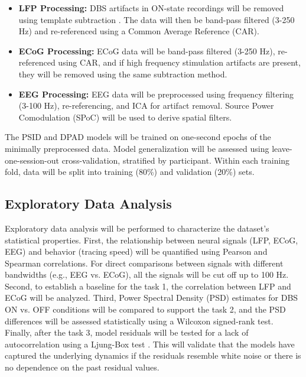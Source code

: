 \documentclass[12pt, a4paper]{article}
\begin{document}
\begin{itemize}

    \item \textbf{LFP Processing:} DBS artifacts in ON-state recordings will be removed using template subtraction \parencite{qianMethodRemovalDeep2017,hammerArtifactCharacterizationMultipurpose2022}. The data will then be band-pass filtered (3-250 Hz) and re-referenced using a Common Average Reference (CAR).

    \item \textbf{ECoG Processing:} ECoG data will be band-pass filtered (3-250 Hz), re-referenced using CAR, and if high frequency stimulation artifacts are present, they will be removed using the same subtraction method.

    \item \textbf{EEG Processing:} EEG data will be preprocessed using frequency filtering (3-100 Hz), re-referencing, and ICA for artifact removal. Source Power Comodulation (SPoC) will be used to derive spatial filters.

\end{itemize}

The PSID and DPAD models will be trained on one-second epochs of the minimally preprocessed data. Model generalization will be assessed using leave-one-session-out cross-validation, stratified by participant. Within each training fold, data will be split into training (80\%) and validation (20\%) sets.

\subsection{Exploratory Data Analysis}

Exploratory data analysis will be performed to characterize the dataset's statistical properties. First, the relationship between neural signals (LFP, ECoG, EEG) and behavior (tracing speed) will be quantified using Pearson and Spearman correlations. For direct comparisons between signals with different bandwidths (e.g., EEG vs. ECoG), all the signals will be cut off up to 100 Hz. Second, to establish a baseline for the task 1, the correlation between LFP and ECoG will be analyzed. Third, Power Spectral Density (PSD) estimates for DBS ON vs. OFF conditions will be compared to support the task 2, and the PSD differences will be assessed statistically using a Wilcoxon signed-rank test. Finally, after the task 3, model residuals will be tested for a lack of autocorrelation using a Ljung-Box test \parencite{ljungMeasureLackFit1978}. This will validate that the models have captured the underlying dynamics if the residuals resemble white noise or there is no dependence on the past residual values.
\end{document}
